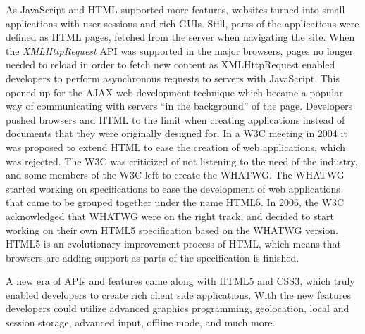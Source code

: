 \documentclass[a4paper,11pt]{kth-mag}
\begin{document}
        As \gls{JavaScript} and \gls{HTML} supported more features, websites turned into small applications with user sessions and rich \glspl{GUI}.
        Still, parts of the applications were defined as \gls{HTML} pages, fetched from the server when navigating the site.
        When the \emph{XMLHttpRequest} \gls{API} was supported in the major \glspl{browser}, pages no longer needed to reload in order to fetch new content as XMLHttpRequest enabled developers to perform asynchronous requests to servers with \gls{JavaScript}.
        This opened up for the \gls{AJAX} \gls{web} development technique which became a popular way of communicating with servers ``in the background'' of the page.
        Developers pushed \glspl{browser} and \gls{HTML} to the limit when creating applications instead of \glspl{document} that they were originally designed for.
        In a \gls{W3C} meeting in 2004 it was proposed to extend \gls{HTML} to ease the creation of \gls{web} applications, which was rejected.
        The \gls{W3C} was criticized of not listening to the need of the industry, and some members of the \gls{W3C} left to create the \gls{WHATWG}.
        The \gls{WHATWG} started working on specifications to ease the development of \gls{web} applications that came to be grouped together under the name \gls{HTML5}.
        In 2006, the \gls{W3C} acknowledged that \gls{WHATWG} were on the right track, and decided to start working on their own \gls{HTML5} specification based on the \gls{WHATWG} version.
        \gls{HTML5} is an evolutionary improvement process of \gls{HTML}, which means that \glspl{browser} are adding support as parts of the specification is finished.

        A new era of \glspl{API} and features came along with \gls{HTML5} and \gls{CSS3}, which truly enabled developers to create rich client side applications.
        With the new features developers could utilize advanced graphics programming, geolocation, local and session storage, advanced input, offline mode, and much more.

\end{document}
